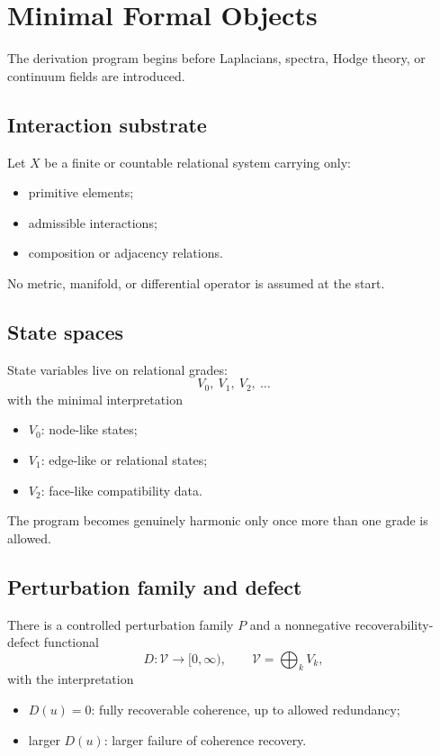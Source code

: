 \documentclass[11pt]{article}
\begin{document}
\section{Minimal Formal Objects}

The derivation program begins before Laplacians, spectra, Hodge theory, or continuum fields are introduced.

\subsection{Interaction substrate}

Let $X$ be a finite or countable relational system carrying only:
\begin{itemize}
\item primitive elements;
\item admissible interactions;
\item composition or adjacency relations.
\end{itemize}

No metric, manifold, or differential operator is assumed at the start.

\subsection{State spaces}

State variables live on relational grades:
\[
V_0,\ V_1,\ V_2,\ \dots
\]
with the minimal interpretation
\begin{itemize}
\item $V_0$: node-like states;
\item $V_1$: edge-like or relational states;
\item $V_2$: face-like compatibility data.
\end{itemize}

The program becomes genuinely harmonic only once more than one grade is allowed.

\subsection{Perturbation family and defect}

There is a controlled perturbation family $P$ and a nonnegative recoverability-defect functional
\[
D : \mathcal V \to [0,\infty),
\qquad
\mathcal V = \bigoplus_k V_k,
\]
with the interpretation
\begin{itemize}
\item $D(u)=0$: fully recoverable coherence, up to allowed redundancy;
\item larger $D(u)$: larger failure of coherence recovery.
\end{itemize}
\end{document}
